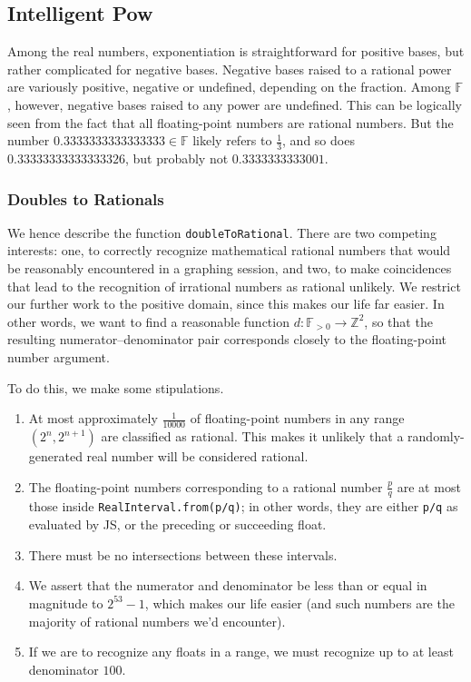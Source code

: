 \documentclass{article}
\newcommand{\finitefp}{\mathbb{F}}
\begin{document}
\subsection{Intelligent Pow}

Among the real numbers, exponentiation is straightforward for positive bases, but rather complicated for negative bases. Negative bases raised to a rational power are variously positive, negative or undefined, depending on the fraction. Among $\finitefp$, however, negative bases raised to any power are undefined. This can be logically seen from the fact that all floating-point numbers are rational numbers. But the number $0.3333333333333333\in\finitefp$ likely refers to $\frac{1}{3}$, and so does $0.33333333333333326$, but probably not $0.3333333333001$.

\subsubsection{Doubles to Rationals}

We hence describe the function \texttt{doubleToRational}. There are two competing interests: one, to correctly recognize mathematical rational numbers that would be reasonably encountered in a graphing session, and two, to make coincidences that lead to the recognition of irrational numbers as rational unlikely. We restrict our further work to the positive domain, since this makes our life far easier. In other words, we want to find a reasonable function $d : \finitefp_{>0} \to \mathbb{Z}^2$, so that the resulting numerator–denominator pair corresponds closely to the floating-point number argument.

To do this, we make some stipulations.

\begin{enumerate}
  \item At most approximately $\frac{1}{10000}$ of floating-point numbers in any range $\left(2^n, 2^{n+1}\right)$ are classified as rational. This makes it unlikely that a randomly-generated real number will be considered rational.
  \item The floating-point numbers corresponding to a rational number $\frac{p}{q}$ are at most those inside \texttt{RealInterval.from(p/q)}; in other words, they are either \texttt{p/q} as evaluated by JS, or the preceding or succeeding float.
  \item There must be no intersections between these intervals.
  \item We assert that the numerator and denominator be less than or equal in magnitude to $2^{53}-1$, which makes our life easier (and such numbers are the majority of rational numbers we'd encounter).
  \item If we are to recognize any floats in a range, we must recognize up to at least denominator $100$.
\end{enumerate}
\end{document}
